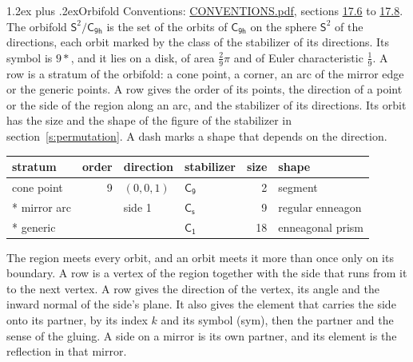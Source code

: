 \documentclass[10pt,a4paper]{article}
\makeatletter
\renewcommand\section{\@startsection{section}{1}{\z@}{-3ex plus -1ex minus -.2ex}%
  {1.2ex plus .2ex}{\normalfont\large\sffamily\bfseries\color{parttitle}}}
\numberwithin{equation}{section}
\newcommand{\grp}[1]{\mathsf{#1}}
\newcommand{\orbname}[1]{#1}
\newcommand{\dirvec}[3]{(#1, #2, #3)}
\newcommand{\twosphere}{\mathsf{S}^{2}}
\makeatother
\begin{document}
\section{Orbifold}\label{s:orbifold}
Conventions: \href{../../CONVENTIONS.pdf}{CONVENTIONS.pdf}, sections \href{../../CONVENTIONS.pdf\#conv.17.6}{17.6} to \href{../../CONVENTIONS.pdf\#conv.17.8}{17.8}.
The orbifold $\twosphere/\grp{C_{9h}}$ is the set of the orbits of $\grp{C_{9h}}$ on the sphere $\twosphere$ of the directions, each orbit marked by the class of the stabilizer of its directions. Its symbol is $\orbname{9{\ast}}$, and it lies on a disk, of area $\tfrac{2}{9}\pi$ and of Euler characteristic $\tfrac{1}{9}$.
\leavevmode\label{n:head.stratum}\label{n:head.order.point}\label{n:head.direction}\label{n:head.stabilizer}\label{n:head.size.orbit}\label{n:head.shape}A row is a stratum of the orbifold: a cone point, a corner, an arc of the mirror edge or the generic points. A row gives the order of its points, the direction of a point or the side of the region along an arc, and the stabilizer of its directions. Its orbit has the size and the shape of the figure of the stabilizer in section~\ref{s:permutation}. A dash marks a shape that depends on the direction.
{\small\setlength{\tabcolsep}{4pt}\begin{longtable}{@{}lrllrl@{}}\toprule
stratum & order & direction & stabilizer & size & shape\\\midrule\endhead
\bottomrule\endfoot\endlastfoot
cone point & 9 & $\dirvec{0}{0}{1}$ & \href{C9.pdf}{$\grp{C_{9}}$} & 2 & segment\\*
mirror arc &  & side 1 & \href{C1v.pdf}{$\grp{C_{s}}$} & 9 & regular enneagon\\*
generic &  &  & \href{C1.pdf}{$\grp{C_{1}}$} & 18 & enneagonal prism\\
\bottomrule\end{longtable}}
\leavevmode\label{n:head.vertex.region}\label{n:head.angle}\label{n:head.normal.side}\label{n:head.partner}\label{n:head.sense}The region meets every orbit, and an orbit meets it more than once only on its boundary. A row is a vertex of the region together with the side that runs from it to the next vertex. A row gives the direction of the vertex, its angle and the inward normal of the side's plane. It also gives the element that carries the side onto its partner, by its index $k$ and its symbol (sym), then the partner and the sense of the gluing. A side on a mirror is its own partner, and its element is the reflection in that mirror.
\end{document}

